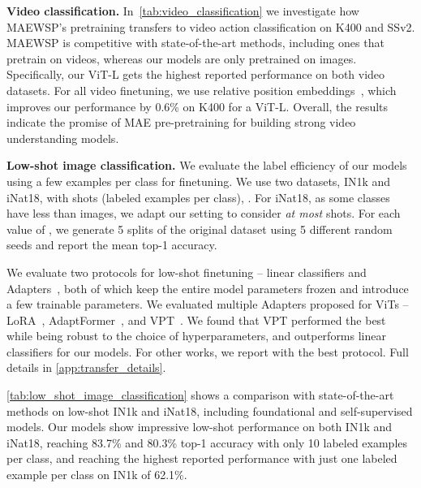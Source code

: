 \documentclass[10pt,twocolumn,letterpaper]{article}
\newcommand{\prept}{pre-pretraining\xspace}
\newcommand{\mae}{MAE\xspace}
\newcommand{\ours}{MAEWSP\xspace}  \newcommand{\oursig}{\ours{}\textsubscript{IG}\xspace}
\newcommand{\vitL}{ViT-L\xspace}
\newcommand{\inetOneKShort}{IN1k\xspace}
\newcommand{\kineticsShort}{K400\xspace}
\newcommand{\inatShort}{iNat18\xspace}
\newcommand{\sthsthShort}{SSv2\xspace}
\newcommand{\sota}{state-of-the-art\xspace}
\begin{document}
{\bf \noindent Video classification.}
In~\cref{tab:video_classification} we investigate how \ours's pretraining transfers to video action classification on \kineticsShort and \sthsthShort. \ours is competitive with \sota
methods, including ones that pretrain on videos, whereas our models are only pretrained on images. Specifically,
our \vitL gets the highest reported performance on both video datasets.
For all video finetuning, we use relative position 
embeddings~\cite{fan2021multiscale}, which improves our performance by 0.6\% on \kineticsShort for a \vitL.
Overall, the results indicate the promise of \mae \prept for building strong video understanding models.

{\bf \noindent Low-shot image classification.}
We evaluate the label efficiency of our models using a few examples per class for finetuning.
We use two datasets, \inetOneKShort and \inatShort, with  shots (labeled examples per class), .
For \inatShort, as some classes have less than  images, we adapt our setting to consider \textit{at most}  shots.
For each value of , we generate 5 splits of the original dataset using 5 different random seeds and report 
the mean top-1 accuracy.

We evaluate two protocols for low-shot finetuning -- linear classifiers and Adapters~\cite{houlsby2019parameter}, both 
of which keep the entire model parameters frozen and introduce a few trainable parameters.
We evaluated multiple Adapters proposed for ViTs -- LoRA~\cite{hu2022lora}, 
AdaptFormer~\cite{chen2022adaptformer}, and VPT~\cite{jia2022visual}. We found that VPT performed the best while being 
robust to the choice of hyperparameters, and outperforms linear classifiers for our models.
For other works, we report with the best protocol. Full details in \cref{app:transfer_details}.

\cref{tab:low_shot_image_classification} shows a comparison with \sota methods on low-shot \inetOneKShort and 
\inatShort, including foundational and self-supervised models.
Our models show impressive low-shot performance on both \inetOneKShort and \inatShort, reaching 83.7\% and 80.3\% 
top-1 accuracy with only 10 labeled examples per class, and reaching the highest reported performance with just one 
labeled example per class on \inetOneKShort of 62.1\%.
\end{document}
